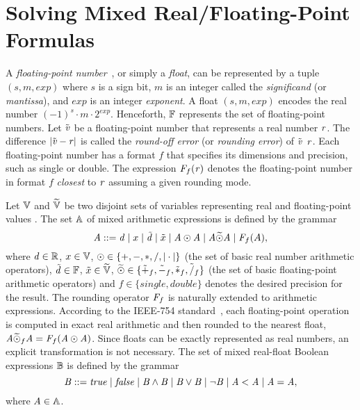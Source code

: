 \documentclass[runningheads,american,orivec,fleqn]{llncs}
\begin{document}
\section{Solving Mixed Real/Floating-Point Formulas}
\label{sec:smt}

A \emph{floating-point number}~\cite{IEEE754floating}, or simply a \emph{float}, can be represented by a tuple $(s, m, \mathit{exp})$ where $s$ is a sign bit, $m$ is an integer called the \emph{significand} (or \emph{mantissa}), and $\mathit{exp}$ is an integer \emph{exponent}.
%
A float $(s, m, \mathit{exp})$ encodes the real number $(-1)^{s} \cdot m \cdot 2^\mathit{exp}$.
%
Henceforth, $\mathbb{F}$ represents the set of floating-point numbers.
% 
Let $\fpv{}$ be a floating-point number that represents a real number
$\rv{}$. The difference $|\fpv{} - \rv{}|$ is called the \emph{round-off error} (or \emph{rounding error}) of $\fpv{}$ \wrt{} $\rv{}$.
%
Each floating-point number has a format $f$ that specifies its dimensions and precision, such as single or double.
%
The expression $\RtoF[f]{\rv{}}$ denotes the floating-point number in
format $f$ \emph{closest} to $\rv{}$ assuming a given rounding mode.

Let $\mathbb{V}$ and $\widetilde{\mathbb{V}}$ be two disjoint sets of variables representing real and floating-point values \resp{}.
%
The set $\mathbb{A}$ of mixed arithmetic expressions is defined by the grammar
%
\begin{equation*}
\AExpr  ::= \rcnst  \mid x \mid \fpcnst \mid \fvar \mid
             \AExpr \rop  \AExpr \mid 
             \AExpr \fpop \AExpr \mid \RtoF[f]{A},
\end{equation*}
% 
where $\mathit{d} \in \mathbb{R}$, $x \in \mathbb{V}$, $\odot \in \{+,-,*,/,|\cdot|\}$
(the set of basic real number arithmetic operators),
$\mathit{\tilde{d}} \in \mathbb{F}$, $\tilde{x} \in \widetilde{\mathbb{V}}$, $\widetilde{\odot} \in \{\tilde{+}_f,\tilde{-}_f,\tilde{*}_f,\tilde{/}_f\}$
(the set of basic floating-point arithmetic operators) and
$f \in\{\mathit{single},\mathit{double}\}$ denotes the desired precision for the result.
%
The rounding operator $\RtoF[f]{}$ is naturally extended to arithmetic expressions.
%
According to the IEEE-754 standard~\cite{IEEE754floating}, each
floating-point operation is computed in exact real arithmetic
and then rounded to the nearest float, \ie{} $\AExpr \fpop_f \AExpr =
\RtoF[f]{\AExpr \rop \AExpr}$.
%
Since floats can be exactly represented as real numbers, an explicit transformation is not necessary.
%
The set of mixed real-float Boolean expressions $\mathbb{B}$  is defined by the grammar
\begin{equation*}
   \mathit{B} ::= \mathit{true} \mid \mathit{false} \mid \mathit{B} \wedge \mathit{B}
               \mid \mathit{B} \vee \mathit{B} \mid \neg \mathit{B}
               \mid \mathit{A} < \mathit{A} \mid \mathit{A} = \mathit{A},
\end{equation*}
%
where $\mathit{A}\in\mathbb{A}$.
\end{document}
